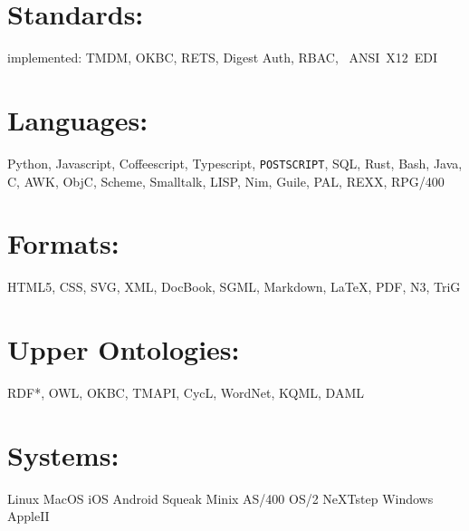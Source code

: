 \documentclass[line,margin,hidelinks]{res}
\def\PS{{\tt P\small OST\tt S\small CRIPT}}
\begin{document}
\begin{resume}
\section{Standards:}
\begin{par}
implemented:
TMDM,
OKBC,
RETS,
Digest Auth,
RBAC,
~ANSI~X12~EDI
\end{par}

\section{Languages:}
\begin{par}
  Python, Javascript, Coffeescript, Typescript, \PS, SQL, Rust, Bash,
  Java, C, AWK, ObjC, Scheme, Smalltalk, LISP, Nim, Guile, PAL, REXX, RPG/400
\end{par}

\section{Formats:}
\begin{par}
  HTML5, CSS, SVG, XML, DocBook, SGML, Markdown, \LaTeX, PDF, N3, TriG
\end{par}

\section{\footnotesize{Upper Ontologies:}}
\begin{par}
  RDF*, OWL, OKBC, TMAPI, CycL, WordNet, KQML, DAML
\end{par}


% 


\section{Systems:}
\begin{par}
Linux MacOS iOS Android Squeak Minix AS/400 OS/2 NeXTstep Windows AppleII
\end{par}


\end{resume}
\end{document}
